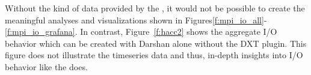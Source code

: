 Without the kind of data provided by the \connector{}, it would not be possible 
to create the meaningful analyses and visualizations shown in 
Figures\ref{f:mpi_io_all}-\ref{f:mpi_io_grafana}. In contrast, 
Figure~\ref{f:hacc2} shows the aggregate I/O behavior which can be created 
with Darshan alone without the DXT plugin. This figure does not illustrate the 
timeseries data and thus, in-depth insights into I/O behavior like the \Darshan{} does.
